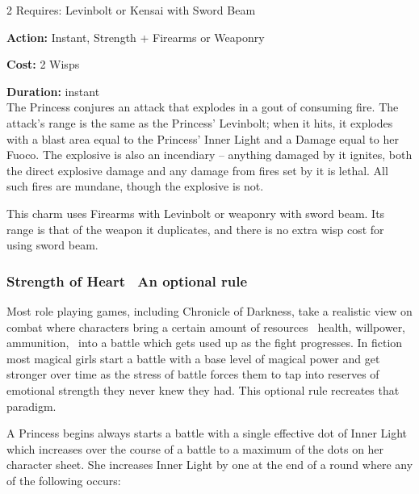 \begin{multicols}{2}
\noindent Requires: Levinbolt or Kensai with Sword Beam

\noindent \textbf{Action:} Instant, Strength + Firearms or Weaponry

\noindent \textbf{Cost:} 2 Wisps

\noindent \textbf{Duration:} instant\\

\noindent The Princess conjures an attack that explodes in a gout of consuming fire. The attack's range is the same as the Princess' Levinbolt; when it hits, it explodes with a blast area equal to the Princess' Inner Light and a Damage equal to her Fuoco. The explosive is also an incendiary -- anything damaged by it ignites, both the direct explosive damage and any damage from fires set by it is lethal. All such fires are mundane, though the explosive is not. 

This charm uses Firearms with Levinbolt or weaponry with sword beam. Its range is that of the weapon it duplicates, and there is no extra wisp cost for using sword beam.

\bigsidebarstart
 
 \subsubsection{Strength of Heart \textemdash\, An optional rule} 
 
 Most role playing games, including Chronicle of Darkness, take a realistic view on combat where characters bring a certain amount of resources \textemdash\, health, willpower, ammunition, \textemdash\, into a battle which gets used up as the fight progresses. In fiction most magical girls start a battle with a base level of magical power and get stronger over time as the stress of battle forces them to tap into reserves of emotional strength they never knew they had. This optional rule recreates that paradigm. 
  
  A Princess begins always starts a battle with a single effective dot of Inner Light which increases over the course of a battle to a maximum of the dots on her character sheet. She increases Inner Light by one at the end of a round where any of the following occurs: 
 

\end{multicols}
